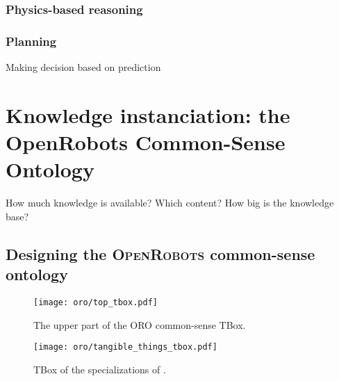 \subsubsection{Physics-based reasoning}
\subsubsection{Planning}
Making decision based on prediction





\section{Knowledge instanciation: the OpenRobots Common-Sense Ontology}

How much knowledge is available? Which content? How big is the knowledge base?

\subsection{Designing the \textsc{OpenRobots} common-sense ontology}
\label{sect|commonsense-design}

\begin{figure}
    \centering
    \texttt{[image: oro/top\_tbox.pdf]}
    \caption{The upper part of the ORO common-sense TBox.}
    \label{fig|upper_tbox}
\end{figure}

\begin{figure}
    \centering
    \texttt{[image: oro/tangible\_things\_tbox.pdf]}
    \caption{TBox of the specializations of .}
    \label{fig|tangible_things_tbox}
\end{figure}
